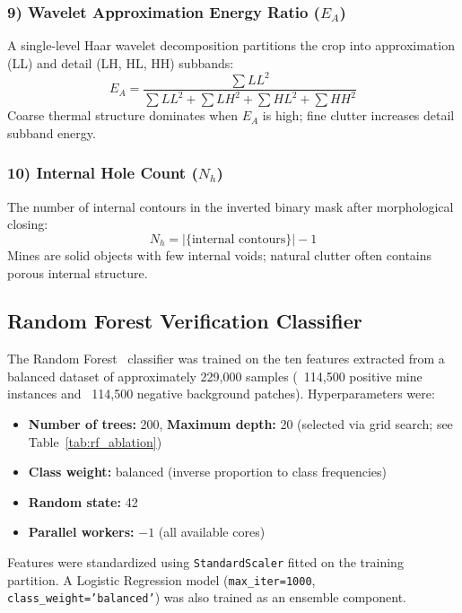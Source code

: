 \documentclass[conference]{IEEEtran}
\begin{document}
\subsubsection*{9) Wavelet Approximation Energy Ratio ($E_A$)}
A single-level Haar wavelet decomposition partitions the crop into approximation (LL) and detail (LH, HL, HH) subbands:
\begin{equation}
  E_A = \frac{\sum LL^2}{\sum LL^2 + \sum LH^2 + \sum HL^2 + \sum HH^2}
\end{equation}
Coarse thermal structure dominates when $E_A$ is high; fine clutter increases detail subband energy.

\subsubsection*{10) Internal Hole Count ($N_h$)}
The number of internal contours in the inverted binary mask after morphological closing:
\begin{equation}
  N_h = |\{ \text{internal contours} \}| - 1
\end{equation}
Mines are solid objects with few internal voids; natural clutter often contains porous internal structure.

\subsection{Random Forest Verification Classifier}

The Random Forest~\cite{breiman2001} classifier was trained on the ten features extracted from a balanced dataset of approximately 229,000 samples (~114,500 positive mine instances and ~114,500 negative background patches). Hyperparameters were:
\begin{itemize}
  \item \textbf{Number of trees:} 200, \textbf{Maximum depth:} 20 (selected via grid search; see Table~\ref{tab:rf_ablation})
  \item \textbf{Class weight:} balanced (inverse proportion to class frequencies)
  \item \textbf{Random state:} 42
  \item \textbf{Parallel workers:} $-1$ (all available cores)
\end{itemize}

Features were standardized using {\tt StandardScaler} fitted on the training partition. A Logistic Regression model ({\tt max\_iter=1000}, {\tt class\_weight='balanced'}) was also trained as an ensemble component.
\end{document}
